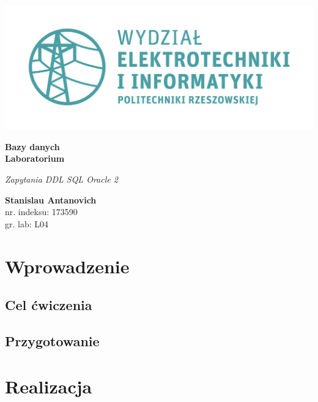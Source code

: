 \documentclass{article}
\begin{document}
\begin{titlepage}
\begin{center}
	\includegraphics[scale=0.7]{logo.png}

	\vspace*{4cm}
	\textbf{Bazy danych\\ Laboratorium}

	\vspace{1.5cm}
	\textit{Zapytania DDL SQL Oracle 2}

	\vspace{1.5cm}
	\textbf{Stanislau Antanovich}\\
	nr. indeksu: 173590\\
	gr. lab: L04

	\vspace{4.5cm}
\end{center}
\end{titlepage}

\tableofcontents
\listoffigures
\lstlistoflistings

\newpage
 
\section{Wprowadzenie}

\subsection{Cel ćwiczenia}

\subsection{Przygotowanie}

\section{Realizacja}
\end{document}
